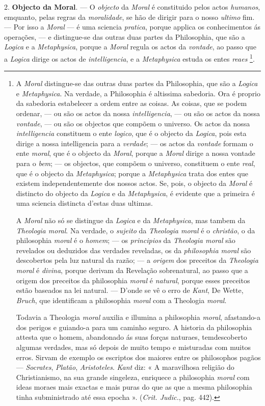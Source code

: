  2. \textbf{Objecto da Moral}. --- O \emph{objecto} da \emph{Moral} é constituido pelos actos \emph{humanos}, emquanto, pelas regras da \emph{moralidade}, se hão de dirigir para o nosso \emph{ultimo} fim. --- Por isso a \emph{Moral} --- é uma sciencia \emph{pratica}, porque applica os conhecimentos ás operações, --- e distingue-se das outras duas partes da Philosophia, que são a \emph{Logica} e a \emph{Metaphysica}, porque a \emph{Moral} regula os actos da \emph{vontade}, ao passo que a \emph{Logica} dirige os actos de \emph{intelligencia}, e a \emph{Metaphysica} estuda os entes \emph{reaes} \footnote{A \emph{Moral} distingue-se das outras duas partes da Philosophia, que são a \emph{Logica} e \emph{Metaphysica}. Na verdade, a Philosophia é altissima sabedoria. Ora é proprio da sabedoria estabelecer a ordem entre as coisas. As coisas, que se podem ordenar, --- ou são os actos da nossa \emph{intelligencia}, --- ou são os actos da nossa \emph{vontade}, --- ou são os objectos que compõem o universo. Os actos da nossa \emph{intelligencia} constituem o ente \emph{logico}, que é o objecto da \emph{Logica}, pois esta dirige a nossa intelligencia para a \emph{verdade}; --- os actos da \emph{vontade} formam o ente \emph{moral}, que é o objecto da \emph{Moral}, porque a \emph{Moral} dirige a nossa vontade para o \emph{bem}; --- os objectos, que compõem o universo, constituem o ente \emph{real}, que é o objecto da \emph{Metaphysica}; porque a \emph{Metaphysica} trata dos entes que existem independentemente dos nossos actos. Se, pois, o objecto da \emph{Moral} é distincto do objecto da \emph{Logica} e da \emph{Metaphysica}, é evidente que a primeira é uma sciencia distincta d'estas duas ultimas.\par A \emph{Moral} não só se distingue da \emph{Logica} e da \emph{Metaphysica}, mas tambem da \emph{Theologia moral}. Na verdade, o \emph{sujeito} da \emph{Theologia moral} é o \emph{christão}, o da philosophia \emph{moral} é o \emph{homem}; --- os \emph{principios} da \emph{Theologia moral} são revelados ou deduzidos das verdades reveladas, os da \emph{philosophia moral} são descobertos pela luz natural da razão; --- a \emph{origem} dos preceitos da \emph{Theologia moral} é \emph{divina}, porque derivam da Revelação sobrenatural, ao passo que a origem dos preceitos da philosophia \emph{moral} é \emph{natural}, porque esses preceitos estão baseados na lei natural. --- D'onde se vê o erro de \emph{Kant}, De Wette, \emph{Bruch}, que identificam a philosophia \emph{moral} com a Theologia \emph{moral}.\par Todavia a Theologia \emph{moral} auxilia e illumina a philosophia \emph{moral}, afastando-a dos perigos e guiando-a para um caminho seguro. A historia da philosophia attesta que o homem, abandonado ás suas forças naturaes, temdescoberto algumas verdades, mas só depois de muito tempo e misturadas com muitos erros. Sirvam de exemplo os escriptos dos maiores entre os philosophos pagãos --- \emph{Socrates}, \emph{Platão}, \emph{Aristoteles}. \emph{Kant} diz: « A maravilhosa religião do Christianismo, na sua grande singeleza, enriquece a philosophia \emph{moral} com ideas moraes mais exactas e mais puras do que as que a mesma philosophia tinha subministrado até essa epocha ». (\emph{Crit. Judic.}, pag. 442).}.

